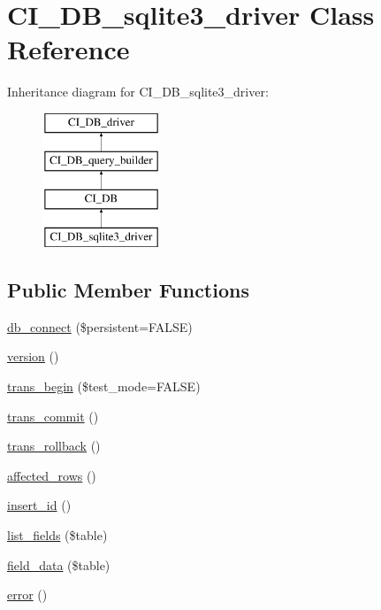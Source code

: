 \hypertarget{class_c_i___d_b__sqlite3__driver}{}\section{C\+I\+\_\+\+D\+B\+\_\+sqlite3\+\_\+driver Class Reference}
\label{class_c_i___d_b__sqlite3__driver}
Inheritance diagram for C\+I\+\_\+\+D\+B\+\_\+sqlite3\+\_\+driver\+:\begin{figure}[H]
\begin{center}
\leavevmode
\includegraphics[height=4.000000cm]{class_c_i___d_b__sqlite3__driver}
\end{center}
\end{figure}
\subsection*{Public Member Functions}
\begin{DoxyCompactItemize}
\item 
\hyperlink{class_c_i___d_b__sqlite3__driver_a52bf595e79e96cc0a7c907a9b45aeb4d}{db\+\_\+connect} (\$persistent=F\+A\+L\+S\+E)
\item 
\hyperlink{class_c_i___d_b__sqlite3__driver_a6080dae0886626b9a4cedb29240708b1}{version} ()
\item 
\hyperlink{class_c_i___d_b__sqlite3__driver_a90e153cf190d273336d77cce930587e1}{trans\+\_\+begin} (\$test\+\_\+mode=F\+A\+L\+S\+E)
\item 
\hyperlink{class_c_i___d_b__sqlite3__driver_af4fbdcdace4aa94a139b64877601fe9b}{trans\+\_\+commit} ()
\item 
\hyperlink{class_c_i___d_b__sqlite3__driver_a53f76d4dfcd6ac04fb653982442aeef8}{trans\+\_\+rollback} ()
\item 
\hyperlink{class_c_i___d_b__sqlite3__driver_a77248aaad33eb132c04cc4aa3f4bc8cb}{affected\+\_\+rows} ()
\item 
\hyperlink{class_c_i___d_b__sqlite3__driver_a933f2cde8dc7f87875e257d0a4902e99}{insert\+\_\+id} ()
\item 
\hyperlink{class_c_i___d_b__sqlite3__driver_aef08cd376b16b24608100ca0e3f2f85b}{list\+\_\+fields} (\$table)
\item 
\hyperlink{class_c_i___d_b__sqlite3__driver_a90355121e1ed009e0efdbd544ab56efa}{field\+\_\+data} (\$table)
\item 
\hyperlink{class_c_i___d_b__sqlite3__driver_a43b8d30b879d4f09ceb059b02af2bc02}{error} ()
\end{DoxyCompactItemize}
